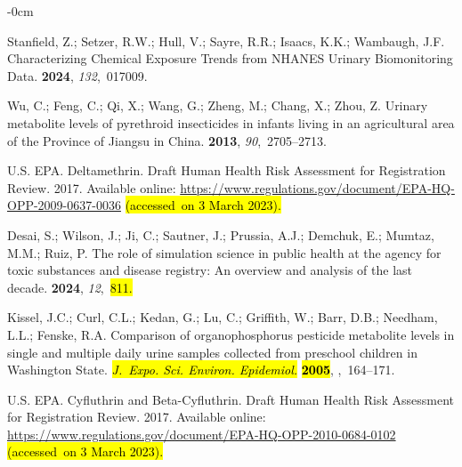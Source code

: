\documentclass[toxics,article,accept,pdftex,moreauthors]{Definitions/mdpi}
\begin{document}
\begin{adjustwidth}{-\extralength}{0cm}
\begin{thebibliography}{999}
Stanfield, Z.; Setzer, R.W.; Hull, V.; Sayre, R.R.; Isaacs, K.K.; Wambaugh,
  J.F.
\newblock Characterizing Chemical Exposure Trends from NHANES Urinary
  Biomonitoring Data.
 {\bf 2024}, {\em
  132},~017009.

Wu, C.; Feng, C.; Qi, X.; Wang, G.; Zheng, M.; Chang, X.; Zhou, Z.
\newblock Urinary metabolite levels of pyrethroid insecticides in infants
  living in an agricultural area of the Province of Jiangsu in China.
 {\bf 2013}, {\em 90},~2705--2713.

{U.S. EPA}.
\newblock Deltamethrin. Draft Human Health Risk Assessment for Registration
  Review.  2017.
\newblock Available online:
  \url{https://www.regulations.gov/document/EPA-HQ-OPP-2009-0637-0036} \hl{(accessed~on 3 March 2023).} %


Desai, S.; Wilson, J.; Ji, C.; Sautner, J.; Prussia, A.J.; Demchuk, E.; Mumtaz,
  M.M.; Ruiz, P.
\newblock The role of simulation science in public health at the agency for
  toxic substances and disease registry: {An} overview and analysis of the last
  decade.
 {\bf 2024}, {\em 12},~\hl{811.} %


Kissel, J.C.; Curl, C.L.; Kedan, G.; Lu, C.; Griffith, W.; Barr, D.B.; Needham,
  L.L.; Fenske, R.A.
\newblock Comparison of organophosphorus pesticide metabolite levels in single
  and multiple daily urine samples collected from preschool children in
  Washington State. \emph{\hl{J.~Expo. Sci. Environ. Epidemiol.} %
} \textbf{\hl{2005}},
,~164--171.

{U.S. EPA}.
\newblock Cyfluthrin and Beta-Cyfluthrin. Draft Human Health Risk Assessment
  for Registration Review.  2017.
\newblock Available online:
  \url{https://www.regulations.gov/document/EPA-HQ-OPP-2010-0684-0102}\hl{ (accessed~on 3 March 2023).} %



\end{thebibliography}
\end{adjustwidth}
\end{document}
